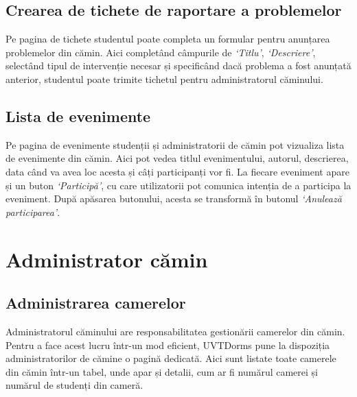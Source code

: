 \documentclass[12pt,a4paper]{report}
\theoremstyle{definition}
\theoremstyle{remark}
\begin{document}

\subsection{Crearea de tichete de raportare a problemelor}

\par Pe pagina de tichete studentul poate completa un formular pentru anunțarea problemelor din cămin. Aici completând câmpurile de \textit{`Titlu'}, \textit{`Descriere'}, selectând tipul de intervenție necesar și specificând dacă problema a fost anunțată anterior, studentul poate trimite tichetul pentru administratorul căminului.


\subsection{Lista de evenimente}

\par Pe pagina de evenimente studenții și administratorii de cămin pot vizualiza lista de evenimente din cămin. Aici pot vedea titlul evenimentului, autorul, descrierea, data când va avea loc acesta și câți participanți vor fi. La fiecare eveniment apare și un buton \textit{`Participă'}, cu care utilizatorii pot comunica intenția de a participa la eveniment. După apăsarea butonului, acesta se transformă în butonul \textit{`Anulează participarea'}.


\section{Administrator cămin}

\subsection{Administrarea camerelor}

\par Administratorul căminului are responsabilitatea gestionării camerelor din cămin. Pentru a face acest lucru într-un mod eficient, UVTDorms pune la dispoziția administratorilor de cămine o pagină dedicată. Aici sunt listate toate camerele din cămin într-un tabel, unde apar și detalii, cum ar fi numărul camerei și numărul de studenți din cameră.
\end{document}
